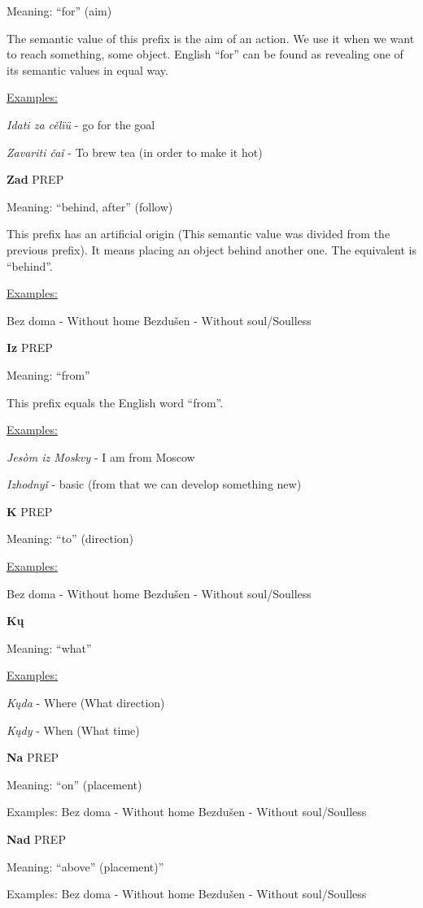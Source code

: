 Meaning: “for” (aim)

The semantic value of this prefix is the aim of an action. We use it when we want to reach something, some object. English “for” can be found as revealing one of its semantic values in equal way. 

\underline{Examples:}

\textit{Idati za cělïü} - go for the goal

\textit{Zavariti čaǐ }- To brew tea (in order to make it hot)


\textbf{Zad} PREP

Meaning: “behind, after” (follow)

This prefix has an artificial origin (This semantic value was divided from the previous prefix). It means placing an object behind another one. The equivalent is “behind”.

\underline{Examples:}

Bez doma - Without home
Bezdušen - Without soul/Soulless 

\textbf{Iz} PREP

Meaning: “from”

This prefix equals the English word “from”. 

\underline{Examples:}

\textit{Jesòm iz Moskvy} - I am from Moscow

\textit{Izhodnyǐ} - basic (from that we can develop something new)

\textbf{K} PREP

Meaning: “to” (direction)

\underline{Examples:}

Bez doma - Without home
Bezdušen - Without soul/Soulless 

\textbf{Kų}

Meaning: “what”

\underline{Examples:}

\textit{Kųda} - Where (What direction)

\textit{Kųdy} - When (What time) 

\textbf{Na} PREP

Meaning: “on” (placement)

Examples:
Bez doma - Without home
Bezdušen - Without soul/Soulless 

\textbf{Nad} PREP

Meaning: “above” (placement)”

Examples:
Bez doma - Without home
Bezdušen - Without soul/Soulless 

